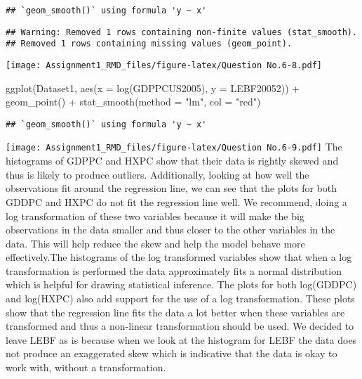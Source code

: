 \documentclass[
]{article}
\newenvironment{Shaded}{\begin{snugshade}}{\end{snugshade}}
\newcommand{\AttributeTok}[1]{\textcolor[rgb]{0.77,0.63,0.00}{#1}}
\newcommand{\FunctionTok}[1]{\textcolor[rgb]{0.00,0.00,0.00}{#1}}
\newcommand{\NormalTok}[1]{#1}
\newcommand{\SpecialCharTok}[1]{\textcolor[rgb]{0.00,0.00,0.00}{#1}}
\newcommand{\StringTok}[1]{\textcolor[rgb]{0.31,0.60,0.02}{#1}}
\begin{document}
\begin{verbatim}
## `geom_smooth()` using formula 'y ~ x'
\end{verbatim}

\begin{verbatim}
## Warning: Removed 1 rows containing non-finite values (stat_smooth).
## Removed 1 rows containing missing values (geom_point).
\end{verbatim}

\texttt{[image: Assignment1\_RMD\_files/figure-latex/Question No.6-8.pdf]}

\begin{Shaded}
\begin{Highlighting}[]
\FunctionTok{ggplot}\NormalTok{(Dataset1, }\FunctionTok{aes}\NormalTok{(}\AttributeTok{x =} \FunctionTok{log}\NormalTok{(GDPPCUS2005), }\AttributeTok{y =}\NormalTok{ LEBF20052)) }\SpecialCharTok{+} 
  \FunctionTok{geom\_point}\NormalTok{() }\SpecialCharTok{+}
  \FunctionTok{stat\_smooth}\NormalTok{(}\AttributeTok{method =} \StringTok{"lm"}\NormalTok{, }\AttributeTok{col =} \StringTok{"red"}\NormalTok{)}
\end{Highlighting}
\end{Shaded}

\begin{verbatim}
## `geom_smooth()` using formula 'y ~ x'
\end{verbatim}

\texttt{[image: Assignment1\_RMD\_files/figure-latex/Question No.6-9.pdf]}
The histograms of GDPPC and HXPC show that their data is rightly skewed
and thus is likely to produce outliers. Additionally, looking at how
well the observations fit around the regression line, we can see that
the plots for both GDDPC and HXPC do not fit the regression line well.
We recommend, doing a log transformation of these two variables because
it will make the big observations in the data smaller and thus closer to
the other variables in the data. This will help reduce the skew and help
the model behave more effectively.The histograms of the log transformed
variables show that when a log transformation is performed the data
approximately fits a normal distribution which is helpful for drawing
statistical inference. The plots for both log(GDDPC) and log(HXPC) also
add support for the use of a log transformation. These plots show that
the regression line fits the data a lot better when these variables are
transformed and thus a non-linear transformation should be used. We
decided to leave LEBF as is because when we look at the histogram for
LEBF the data does not produce an exaggerated skew which is indicative
that the data is okay to work with, without a transformation.
\end{document}
